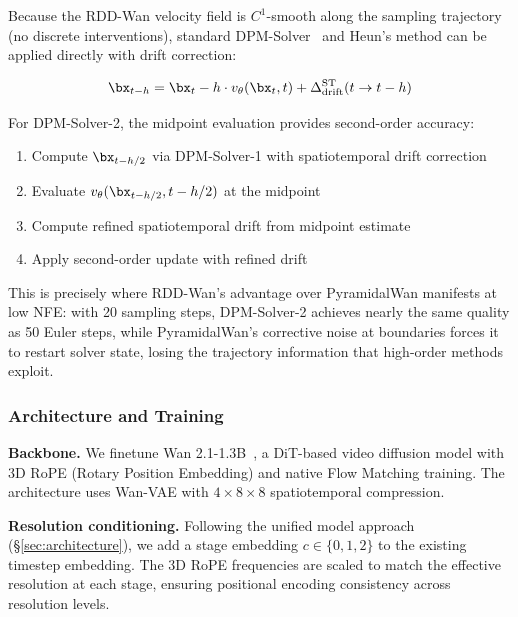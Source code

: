 Because the RDD-Wan velocity field is $C^1$-smooth along the sampling trajectory (no discrete interventions), standard DPM-Solver~\citep{lu2022dpm} and Heun's method can be applied directly with drift correction:

\begin{equation}
    \bx_{t-h} = \bx_t - h \cdot v_\theta(\bx_t, t) + \Delta_{\text{drift}}^{\text{ST}}(t \to t-h)
\end{equation}

For DPM-Solver-2, the midpoint evaluation provides second-order accuracy:
\begin{enumerate}
    \item Compute $\bx_{t-h/2}$ via DPM-Solver-1 with spatiotemporal drift correction
    \item Evaluate $v_\theta(\bx_{t-h/2}, t-h/2)$ at the midpoint
    \item Compute refined spatiotemporal drift from midpoint estimate
    \item Apply second-order update with refined drift
\end{enumerate}

This is precisely where RDD-Wan's advantage over PyramidalWan manifests at low NFE: with 20 sampling steps, DPM-Solver-2 achieves nearly the same quality as 50 Euler steps, while PyramidalWan's corrective noise at boundaries forces it to restart solver state, losing the trajectory information that high-order methods exploit.

\subsubsection{Architecture and Training}

\textbf{Backbone.} We finetune Wan 2.1-1.3B~\citep{wan2025wan}, a DiT-based video diffusion model with 3D RoPE (Rotary Position Embedding) and native Flow Matching training.
The architecture uses Wan-VAE with $4\times 8\times 8$ spatiotemporal compression.

\textbf{Resolution conditioning.} Following the unified model approach (\S\ref{sec:architecture}), we add a stage embedding $c \in \{0, 1, 2\}$ to the existing timestep embedding.
The 3D RoPE frequencies are scaled to match the effective resolution at each stage, ensuring positional encoding consistency across resolution levels.

